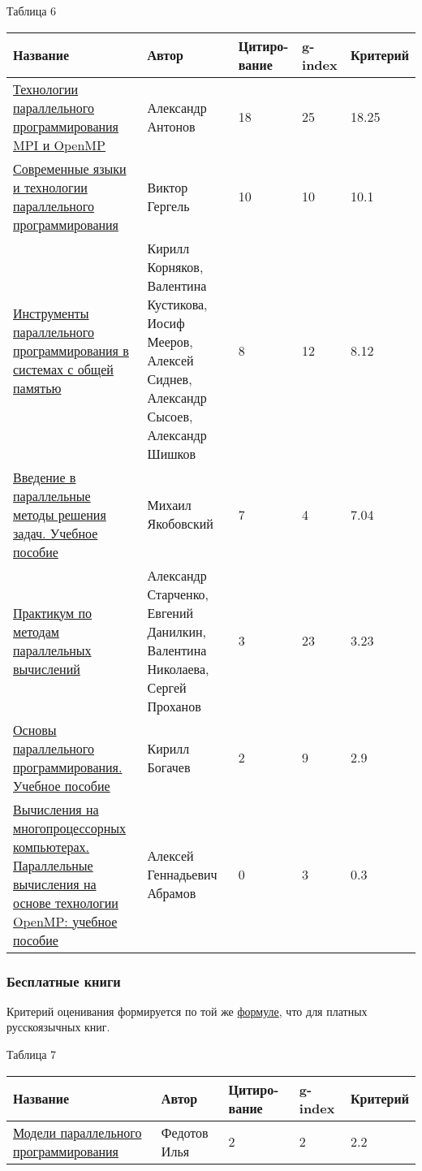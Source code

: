 \documentclass{article}
\begin{document}
			\begin{flushleft}
				Таблица 6
				\begin{longtable}{|p{6cm}|p{4cm}|p{1.8cm}|p{1.55cm}|p{2cm}|}
\hline
Название & Автор & Цитиро-вание & g-index & Критерий \\\hline

\href{https://www.ozon.ru/context/detail/id/19898952}{Технологии параллельного программирования MPI и OpenMP} &
Александр Антонов & 18 & 25 & 18.25\\\hline 

\href{https://www.ozon.ru/context/detail/id/19453470}{Современные языки и технологии параллельного программирования} &
Виктор Гергель & 10 & 10 & 10.1\\\hline

\href{https://www.ozon.ru/context/detail/id/7374160}{Инструменты параллельного программирования в системах с общей памятью} &
Кирилл Корняков, Валентина Кустикова, Иосиф Мееров, Алексей Сиднев, Александр Сысоев, Александр Шишков & 8 & 12 & 8.12\\\hline

\href{https://www.ozon.ru/context/detail/id/23944160}{Введение в параллельные методы решения задач. Учебное пособие} &
Михаил Якобовский & 7 & 4 & 7.04\\\hline

\href{https://www.ozon.ru/context/detail/id/7374161}{Практикум по методам параллельных вычислений} &
Александр Старченко, Евгений Данилкин, Валентина Николаева, Сергей Проханов & 3 & 23 & 3.23\\\hline

\href{https://www.ozon.ru/context/detail/id/28338796}{Основы параллельного программирования. Учебное пособие} &
Кирилл Богачев & 2 & 9 & 2.9 \\\hline

\href{https://books.google.ru/books?id=9n7UkQEACAAJ&hl=ru&sa=X&ved=0ahUKEwi_zKeMs6HLAhXLiCwKHSjuBjQQ6AEIHDAA}{Вычисления на многопроцессорных компьютерах. Параллельные вычисления на основе технологии OpenMP: учебное пособие} &
Алексей Геннадьевич Абрамов & 0 & 3 & 0.3 \\\hline
				\end{longtable}
\newpage	
			\end{flushleft}
\newpage
		\subsubsection{Бесплатные книги}
		Критерий оценивания формируется по той же \hyperlink{formula2}{формуле}, что для платных русскоязычных книг.			
			\begin{flushleft}
				Таблица 7
				\begin{longtable}{|p{6cm}|p{4cm}|p{1.8cm}|p{1.55cm}|p{2cm}|}
\hline
Название & Автор & Цитиро-вание & g-index & Критерий \\\hline

\href{http://pp-book.narod.ru/ppm-book.html}{Модели параллельного программирования} &
Федотов Илья & 2 & 2 & 2.2 \\\hline


				\end{longtable}
			\end{flushleft}
\newpage
\end{document}
